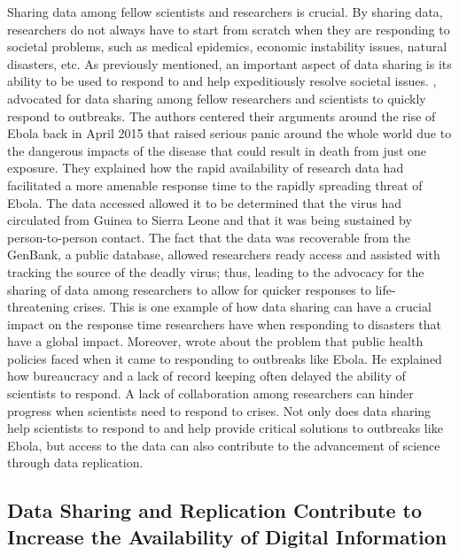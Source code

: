 \documentclass[sigconf]{acmart}
\begin{document}
Sharing data among fellow scientists and researchers is crucial. By sharing data, researchers do not always have to start from scratch when they are responding to societal problems, such as medical epidemics, economic instability issues, natural disasters, etc.  As previously mentioned, an important aspect of data sharing is its ability to be used to respond to and help expeditiously resolve societal issues. \cite{yozwiak2015data}, advocated for data sharing among fellow researchers and scientists to quickly respond to outbreaks. The authors centered their arguments around the rise of Ebola back in April 2015 that raised serious panic around the whole world due to the dangerous impacts of the disease that could result in death from just one exposure. They explained how the rapid availability of research data had facilitated a more amenable response time to the rapidly spreading threat of Ebola. The data accessed allowed it to be determined that the virus had circulated from Guinea to Sierra Leone and that it was being sustained by person-to-person contact. The fact that the data was recoverable from the GenBank, a public database, allowed researchers ready access and assisted with tracking the source of the deadly virus; thus, leading to the advocacy for the sharing of data among researchers to allow for quicker responses to life-threatening crises. This is one example of how data sharing can have a crucial impact on the response time researchers have when responding to disasters that have a global impact. Moreover, \cite{vogel2014delays} wrote about the problem that public health policies faced when it came to responding to outbreaks like Ebola. He explained how bureaucracy and a lack of record keeping often delayed the ability of scientists to respond. A lack of collaboration among researchers can hinder progress when scientists need to respond to crises. Not only does data sharing help scientists to respond to and help provide critical solutions to outbreaks like Ebola, but access to the data can also contribute to the advancement of science through data replication. 

\subsection{Data Sharing and Replication Contribute to Increase the Availability of Digital Information}
\end{document}

